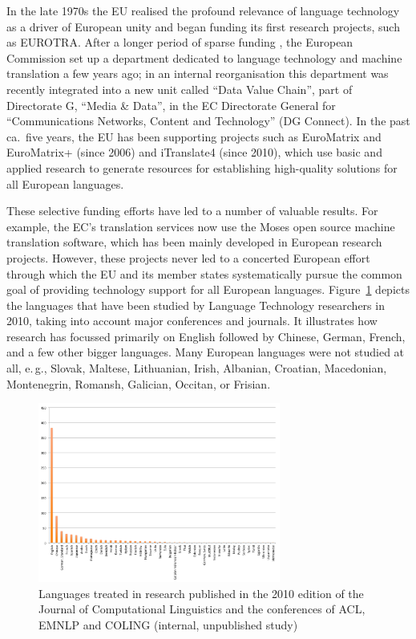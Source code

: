 \documentclass[10pt, plain]{../../metanetpaper}
\begin{document}
\begin{multicols}{2}
In the late 1970s the EU realised the profound relevance of language technology as a driver of European unity and began funding its first research projects, such as EUROTRA. After a longer period of sparse funding \cite{laz1,euromap}, the European Commission set up a department dedicated to language technology and machine translation a few years ago; in an internal reorganisation this department was recently integrated into a new unit called ``Data Value Chain'', part of Directorate G, ``Media \& Data'', in the EC Directorate General for ``Communications Networks, Content and Technology'' (DG Connect). In the past ca.~five years, the EU has been supporting projects such as EuroMatrix and EuroMatrix+ (since 2006) and iTranslate4 (since 2010), which use basic and applied research to generate resources for establishing high-quality solutions for all European languages.

These selective funding efforts have led to a number of valuable results. For example, the EC's translation services now use the Moses open source machine translation software, which has been mainly developed in European research projects. However, these projects never led to a concerted European effort through which the EU and its member states systematically pursue the common goal of providing technology support for all European languages. Figure~\ref{fig:languages-in-research} depicts the languages that have been studied by Language Technology researchers in 2010, taking into account major conferences and journals. It illustrates how research has focussed primarily on English followed by Chinese, German, French, and a few other bigger languages. Many European languages were not studied at all, e.\,g., Slovak, Maltese, Lithuanian, Irish, Albanian, Croatian, Macedonian, Montenegrin, Romansh, Galician, Occitan, or Frisian.

\begin{figure}[htb]
  \center
  \includegraphics[width=0.71\textwidth]{../_media/Languages-in-LT-Research}
  \caption{Languages treated in research published in the 2010 edition of the Journal of Computational Linguistics and the conferences of ACL, EMNLP and COLING (internal, unpublished study)}
  \label{fig:languages-in-research}
\end{figure}


\end{multicols}
\end{document}
